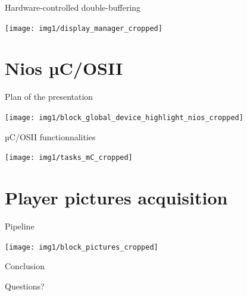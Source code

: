 \documentclass[10pt]{beamer}
\begin{document}
\begin{frame}{Hardware-controlled double-buffering}
    \begin{center}
        \texttt{[image: img1/display\_manager\_cropped]}
    \end{center}
    

\end{frame}

\section{Nios µC/OSII}
\begin{frame}{Plan of the presentation}
    \begin{center}
        \texttt{[image: img1/block\_global\_device\_highlight\_nios\_cropped]}
    \end{center}
\end{frame}

\begin{frame}{µC/OSII functionnalities}
    \begin{center}
        \texttt{[image: img1/tasks\_mC\_cropped]}
    \end{center}
\end{frame}

\section{Player pictures acquisition}

\begin{frame}{Pipeline}
    \begin{center}
        \texttt{[image: img1/block\_pictures\_cropped]}
    \end{center}
\end{frame}

\begin{frame}[standout]
    Conclusion
\end{frame}

\begin{frame}[standout]
    Questions?
\end{frame}

\appendix

%  	
%  	
\end{document}
